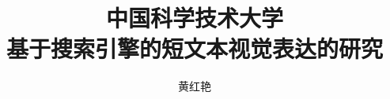 \documentclass[bachelor,fontset=windowsold]{ustcthesis}
\title{中国科学技术大学\\基于搜索引擎的短文本视觉表达的研究}
\author{黄红艳}
\begin{document}
\maketitle

%
%
%

\frontmatter

\tableofcontents


\listoffigures
\listoftables
\listofalgorithms  %
% 

\mainmatter








%

%
%
%
%
%
%


\appendix

\backmatter
%
%
\end{document}
